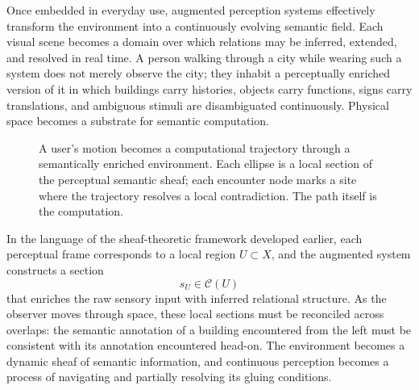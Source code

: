 \documentclass[12pt,a4paper,openany]{book}
\theoremstyle{plain}
\theoremstyle{definition}
\theoremstyle{remark}
\begin{document}
Once embedded in everyday use, augmented perception systems effectively transform the environment into a continuously evolving semantic field. Each visual scene becomes a domain over which relations may be inferred, extended, and resolved in real time. A person walking through a city while wearing such a system does not merely observe the city; they inhabit a perceptually enriched version of it in which buildings carry histories, objects carry functions, signs carry translations, and ambiguous stimuli are disambiguated continuously. Physical space becomes a substrate for semantic computation.

\begin{figure}[h]
\centering
{}
\caption[Embodied trajectory glyph, Chapter~17: augmented perception]{A user's motion becomes a computational trajectory through a semantically enriched environment. Each ellipse is a local section of the perceptual semantic sheaf; each encounter node marks a site where the trajectory resolves a local contradiction. The path itself is the computation.}
\label{fig:glyph_trajectory}
\end{figure}

In the language of the sheaf-theoretic framework developed earlier, each perceptual frame corresponds to a local region $U \subset X$, and the augmented system constructs a section
\[
s_U \in \mathcal{C}(U)
\]
that enriches the raw sensory input with inferred relational structure. As the observer moves through space, these local sections must be reconciled across overlaps: the semantic annotation of a building encountered from the left must be consistent with its annotation encountered head-on. The environment becomes a dynamic sheaf of semantic information, and continuous perception becomes a process of navigating and partially resolving its gluing conditions.
\end{document}
